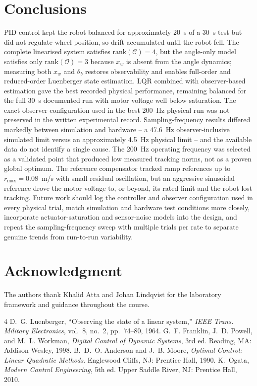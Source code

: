 \documentclass[conference]{IEEEtran}
\begin{document}
\section{Conclusions}\label{sec:conclusion}
PID control kept the robot balanced for approximately 20~s of a 30~s test but did not regulate wheel position, so drift accumulated until the robot fell. The complete linearised system satisfies $\mathrm{rank}(\mathcal{C})=4$, but the angle-only model satisfies only $\mathrm{rank}(\mathcal{O})=3$ because $x_w$ is absent from the angle dynamics; measuring both $x_w$ and $\theta_b$ restores observability and enables full-order and reduced-order Luenberger state estimation. LQR combined with observer-based estimation gave the best recorded physical performance, remaining balanced for the full 30~s documented run with motor voltage well below saturation. The exact observer configuration used in the best 200~Hz physical run was not preserved in the written experimental record. Sampling-frequency results differed markedly between simulation and hardware -- a 47.6~Hz observer-inclusive simulated limit versus an approximately 4.5~Hz physical limit -- and the available data do not identify a single cause. The 200~Hz operating frequency was selected as a validated point that produced low measured tracking norms, not as a proven global optimum. The reference compensator tracked ramp references up to $r_{\max}=0.08$~m/s with small residual oscillation, but an aggressive sinusoidal reference drove the motor voltage to, or beyond, its rated limit and the robot lost tracking. Future work should log the controller and observer configuration used in every physical trial, match simulation and hardware test conditions more closely, incorporate actuator-saturation and sensor-noise models into the design, and repeat the sampling-frequency sweep with multiple trials per rate to separate genuine trends from run-to-run variability.

\section*{Acknowledgment}
The authors thank Khalid Atta and Johan Lindqvist for the laboratory framework and guidance throughout the course.

\footnotesize
\begin{thebibliography}{4}
 D.~G. Luenberger, ``Observing the state of a linear system,'' \emph{IEEE Trans. Military Electronics}, vol.~8, no.~2, pp.~74--80, 1964.
 G.~F. Franklin, J.~D. Powell, and M.~L. Workman, \emph{Digital Control of Dynamic Systems}, 3rd ed. Reading, MA: Addison-Wesley, 1998.
 B.~D.~O. Anderson and J.~B. Moore, \emph{Optimal Control: Linear Quadratic Methods}. Englewood Cliffs, NJ: Prentice Hall, 1990.
 K.~Ogata, \emph{Modern Control Engineering}, 5th ed. Upper Saddle River, NJ: Prentice Hall, 2010.
\end{thebibliography}
\end{document}

